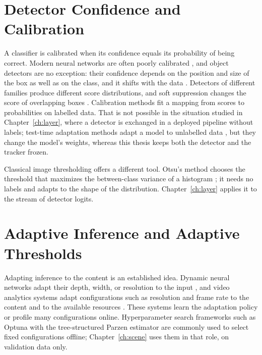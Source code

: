 \section{Detector Confidence and Calibration}\label{sec:bg-confidence}
A classifier is calibrated when its confidence equals its probability of being correct. Modern neural networks are often poorly calibrated \cite{guo2017calibration}, and object detectors are no exception: their confidence depends on the position and size of the box as well as on the class, and it shifts with the data \cite{kuppers2020detcalib}. Detectors of different families \cite{redmon2016yolo,ren2017fasterrcnn,carion2020detr,zhao2024rtdetr} produce different score distributions, and soft suppression changes the score of overlapping boxes \cite{bodla2017softnms}. Calibration methods fit a mapping from scores to probabilities on labelled data. That is not possible in the situation studied in Chapter~\ref{ch:layer}, where a detector is exchanged in a deployed pipeline without labels; test-time adaptation methods adapt a model to unlabelled data \cite{wang2021tent}, but they change the model's weights, whereas this thesis keeps both the detector and the tracker frozen.

Classical image thresholding offers a different tool. Otsu's method chooses the threshold that maximizes the between-class variance of a histogram \cite{otsu1979}; it needs no labels and adapts to the shape of the distribution. Chapter~\ref{ch:layer} applies it to the stream of detector logits.

\section{Adaptive Inference and Adaptive Thresholds}\label{sec:bg-adaptive}
Adapting inference to the content is an established idea. Dynamic neural networks adapt their depth, width, or resolution to the input \cite{han2022dynamic}, and video analytics systems adapt configurations such as resolution and frame rate to the content and to the available resources \cite{jiang2018chameleon}. These systems learn the adaptation policy or profile many configurations online. Hyperparameter search frameworks such as Optuna with the tree-structured Parzen estimator \cite{akiba2019optuna} are commonly used to select fixed configurations offline; Chapter~\ref{ch:scene} uses them in that role, on validation data only.

